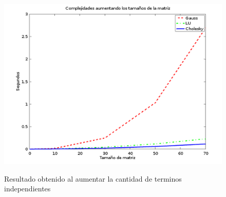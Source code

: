 \begin{figure}[h]
   \includegraphics[scale=0.5]{complejidadesCorrecto.png}
   \label{Fig. 7}
   \caption{Resultado obtenido al aumentar la cantidad de terminos independientes}
\end{figure}